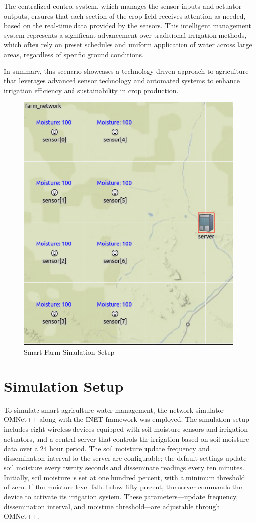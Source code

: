 \documentclass[12pt]{article}
\begin{document}
The centralized control system, which manages the sensor inputs and actuator outputs, ensures that each section of the crop field receives attention as needed, based on the real-time data provided by the sensors. This intelligent management system represents a significant advancement over traditional irrigation methods, which often rely on preset schedules and uniform application of water across large areas, regardless of specific ground conditions.

In summary, this scenario showcases a technology-driven approach to agriculture that leverages advanced sensor technology and automated systems to enhance irrigation efficiency and sustainability in crop production.

\begin{figure}[ht!]
  \centering
  \includegraphics[width=0.8\linewidth]{images/smart_farm.png}  
  \caption{Smart Farm Simulation Setup}
  \label{fig:sim} 
\end{figure}
\section{Simulation Setup}\label{sec:sim}
To simulate smart agriculture water management, the network simulator OMNet++ along with the INET framework was employed. The simulation setup includes eight wireless devices equipped with soil moisture sensors and irrigation actuators, and a central server that controls the irrigation based on soil moisture data over a 24 hour period. The soil moisture update frequency and dissemination interval to the server are configurable; the default settings update soil moisture every twenty seconds and disseminate readings every ten minutes. Initially, soil moisture is set at one hundred percent, with a minimum threshold of zero. If the moisture level falls below fifty percent, the server commands the device to activate its irrigation system. These parameters—update frequency, dissemination interval, and moisture threshold—are adjustable through OMNet++.
\end{document}

